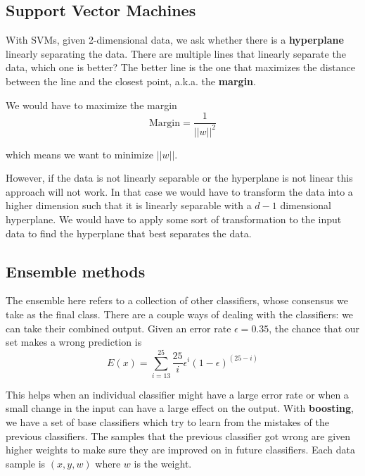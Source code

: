 \documentclass[
  paper=a4,
,captions=tableheading
]{scrartcl}
\begin{document}
\hypertarget{support-vector-machines}{%
\subsection{Support Vector Machines}\label{support-vector-machines}}

With SVMs, given 2-dimensional data, we ask whether there is a
\textbf{hyperplane} linearly separating the data. There are multiple
lines that linearly separate the data, which one is better? The better
line is the one that maximizes the distance between the line and the
closest point, a.k.a. the \textbf{margin}.

We would have to maximize the margin \begin{equation}
    \textrm{Margin} = \frac{1}{||w||^{2}}
\end{equation}

which means we want to minimize \(||w||\).

However, if the data is not linearly separable or the hyperplane is not
linear this approach will not work. In that case we would have to
transform the data into a higher dimension such that it is linearly
separable with a \(d-1\) dimensional hyperplane. We would have to apply
some sort of transformation to the input data to find the hyperplane
that best separates the data.

\hypertarget{ensemble-methods}{%
\subsection{Ensemble methods}\label{ensemble-methods}}

The ensemble here refers to a collection of other classifiers, whose
consensus we take as the final class. There are a couple ways of dealing
with the classifiers: we can take their combined output. Given an error
rate \(\epsilon = 0.35\), the chance that our set makes a wrong
prediction is \begin{equation}
    E(x) = \sum_{i=13}^{25}\frac{25}{i}\epsilon^{i}(1-\epsilon)^{(25-i)}
\end{equation}

This helps when an individual classifier might have a large error rate
or when a small change in the input can have a large effect on the
output. With \textbf{boosting}, we have a set of base classifiers which
try to learn from the mistakes of the previous classifiers. The samples
that the previous classifier got wrong are given higher weights to make
sure they are improved on in future classifiers. Each data sample is
\((x, y, w)\) where \(w\) is the weight.
\end{document}
